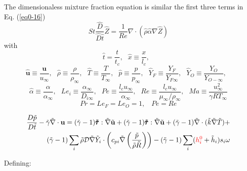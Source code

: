 \documentclass[preprint,12pt,authoryear]{elsarticle}
\begin{document}
{{The dimensionaless mixture fraction equation is similar the first three terms in Eq. (\ref{eq0-16})
\begin{equation}
     St\frac{\hat{D}}{\hat{D} \hat{t}} \hat{Z}
     = 
    \frac{1}{Re} \nabla \cdot (  \hat{\rho} \hat{\alpha}  \nabla \hat{Z})  
\label{eq0-18}
\end{equation}
with
%
\[
    \hat{t} = \frac{t}{t_c}, \ \ \ 
    \hat{x} \equiv \frac{x}{l_c}, \ \ \ 
\]
\[
    \pmb{\hat{u}} \equiv \frac{\pmb{u} }{ u_{\infty} }, \ \ \
    \hat{\rho}    \equiv \frac{\rho    }{ \rho_{\infty}}, \ \ \ 
    \hat{T}       \equiv \frac{T       }{ T_{\infty}}, \ \ \ 
    \hat{p}       \equiv \frac{p       }{ p_{\infty}}, \ \ \ 
    \hat{Y}_F     \equiv \frac{Y_F     }{ Y_{F\infty}}, \ \ \
    \hat{Y}_O     \equiv \frac{Y_O     }{ Y_{O-\infty}}, \ \ \ 
\]
\[
    \hat{\alpha} 
         \equiv \frac{\alpha           }
                     {\alpha_{\infty}  }, \ \ \ 
    Le_i \equiv \frac{ \alpha_{\infty} }
                     { D_{i\infty}     } , \ \ \ 
    Pe \equiv \frac{ l_c u_{\infty}    }
                   { \alpha_{\infty}   },  \ \ \ 
    Re \equiv \frac{ l_c u_{\infty}    } 
                   { \mu_{\infty} / \rho_{\infty} },  \ \ \ 
    Ma \equiv \frac{u_{\infty}^2}{\gamma R T_{\infty}}
\]
\[
    Pr=Le_F=Le_O=1,\ \ \ \ Pe = Re
\]
}

\newpage

\begin{equation}
\begin{split}
        \frac{D \tilde{p}}{D\tilde{t}}
	-
	\tilde{\gamma}
	\tilde{\nabla}\cdot{\mathbf{u}}
        =
	(\tilde{\gamma}-1)
        \pmb{\tilde{\tau}}:\tilde{\nabla} \tilde{\mathbf{u}} 
        + 
	(\tilde{\gamma}-1)
        \pmb{\tilde{\tau}}:\tilde{\nabla} \tilde{\mathbf{u}} 
        + 
	(\tilde{\gamma}-1)
        \tilde{\nabla} \cdot (\tilde{k}\tilde{\nabla} \tilde{T})
        +
	\\
	(\tilde{\gamma}-1)
        \sum\limits_i 
        \tilde{\rho}
        \mathcal{D}
        \tilde{\nabla}
        \tilde{Y}_i     
        \cdot
        \left(
                c_{pi}
                \tilde{\nabla}
                \left(
                	\frac{\tilde{p}}{\tilde{\rho}\tilde{R}}
                \right)
        \right)
	- 
	(\tilde{\gamma}-1)
        \sum\limits_i
        ({\color{red} h_i^0} + \tilde{h}_i)
        s_i	
        \omega
\end{split}
\end{equation}

Defining:

}
\end{document}
